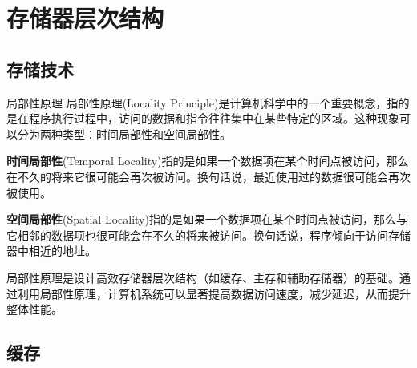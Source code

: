 \section{存储器层次结构}
\subsection{存储技术}

\begin{sidenote}{局部性原理}
    局部性原理(Locality Principle)是计算机科学中的一个重要概念，指的是在程序执行过程中，访问的数据和指令往往集中在某些特定的区域。这种现象可以分为两种类型：时间局部性和空间局部性。
    
    \textbf{时间局部性}(Temporal Locality)指的是如果一个数据项在某个时间点被访问，那么在不久的将来它很可能会再次被访问。换句话说，最近使用过的数据很可能会再次被使用。
    
    \textbf{空间局部性}(Spatial Locality)指的是如果一个数据项在某个时间点被访问，那么与它相邻的数据项也很可能会在不久的将来被访问。换句话说，程序倾向于访问存储器中相近的地址。
    
    局部性原理是设计高效存储器层次结构（如缓存、主存和辅助存储器）的基础。通过利用局部性原理，计算机系统可以显著提高数据访问速度，减少延迟，从而提升整体性能。

\end{sidenote}
\subsection{缓存}
